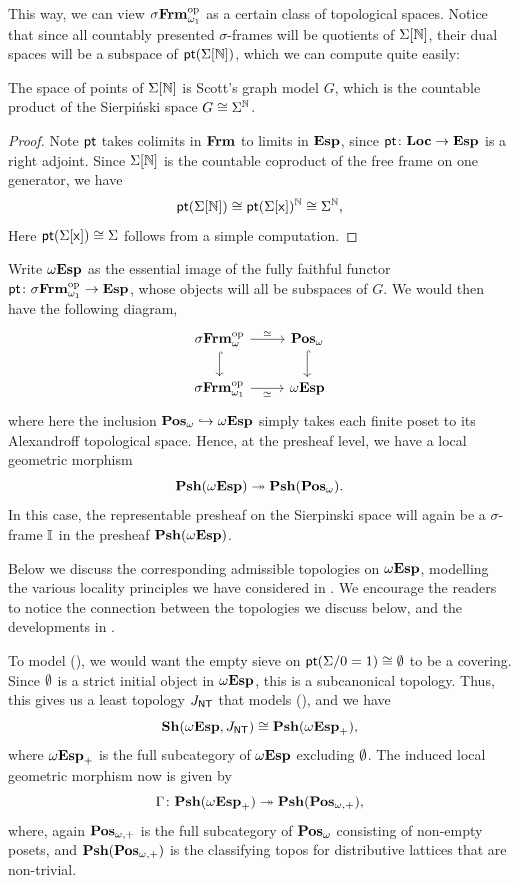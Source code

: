 This way, we can view $\sigma\mathbf{Frm}_{\omega_1}^{\mathrm{op}}$ as a certain class of topological spaces. Notice that since all countably presented $\sigma$-frames will be quotients of $\Sigma[\mathbb{N}]$, their dual spaces will be a subspace of $\mathsf{pt}(\Sigma[\mathbb{N}])$, which we can compute quite easily:

\begin{lemma}
  The space of points of $\Sigma[\mathbb{N}]$ is Scott's graph model $G$, which is the countable product of the Sierpi\'nski space $G \cong \Sigma^{\mathbb{N}}$.
\end{lemma}
\begin{proof}
  Note $\mathsf{pt}$ takes colimits in $\mathbf{Frm}$ to limits in $\mathbf{Esp}$, since $\mathsf{pt} \colon \mathbf{Loc} \to \mathbf{Esp}$ is a right adjoint. Since $\Sigma[\mathbb{N}]$ is the countable coproduct of the free frame on one generator, we have
  \[ \mathsf{pt}(\Sigma[\mathbb{N}]) \cong \mathsf{pt}(\Sigma[\mathsf{x}])^{\mathbb{N}} \cong \Sigma^{\mathbb{N}}\text{,} \]
  Here $\mathsf{pt}(\Sigma[\mathsf{x}]) \cong \Sigma$ follows from a simple computation.
\end{proof}

Write $\omega\mathbf{Esp}$ as the essential image of the fully faithful functor $\mathsf{pt} \colon \sigma\mathbf{Frm}_{\omega_1}^{\mathrm{op}} \to \mathbf{Esp}$, whose objects will all be subspaces of $G$. We would then have the following diagram,
\[
\begin{tikzcd}
  \sFrm\fp\op \ar[d, hook] \ar[r, "\simeq"] & \Pos\fp \ar[d, hook] \\
  \sFrm\cp\op \ar[r, "\simeq"'] & \wTop
\end{tikzcd}
\]
where here the inclusion $\mathbf{Pos}_\omega \hookrightarrow \omega\mathbf{Esp}$ simply takes each finite poset to its Alexandroff topological space. Hence, at the presheaf level, we have a local geometric morphism
\[ \mathbf{Psh}(\omega\mathbf{Esp}) \twoheadrightarrow \mathbf{Psh}(\mathbf{Pos}_\omega)\text{.} \]
In this case, the representable presheaf on the Sierpinski space will again be a $\sigma$-frame $\mathbb{I}$ in the presheaf $\mathbf{Psh}(\omega\mathbf{Esp})$.

Below we discuss the corresponding admissible topologies on $\omega\mathbf{Esp}$, modelling the various locality principles we have considered in . We encourage the readers to notice the connection between the topologies we discuss below, and the developments in .

\begin{example}[\AxiomNT]
  To model (\AxiomNT), we would want the empty sieve on $\mathsf{pt}(\Sigma/0=1) \cong \emptyset$ to be a covering. Since $\emptyset$ is a strict initial object in $\omega\mathbf{Esp}$, this is a subcanonical topology. Thus, this gives us a least topology $J_{\mathsf{NT}}$ that models (\AxiomNT), and we have
  \[ \mathbf{Sh}(\omega\mathbf{Esp},J_{\mathsf{NT}}) \cong \mathbf{Psh}(\omega\mathbf{Esp}_+)\text{,} \]
  where $\omega\mathbf{Esp}_+$ is the full subcategory of $\omega\mathbf{Esp}$ excluding $\emptyset$. The induced local geometric morphism now is given by 
  \[ \Gamma \colon \mathbf{Psh}(\omega\mathbf{Esp}_+) \twoheadrightarrow \mathbf{Psh}(\mathbf{Pos}_{\mathrm{\omega,+}})\text{,} \]
  where, again $\mathbf{Pos}_{\mathrm{\omega,+}}$ is the full subcategory of $\mathbf{Pos}_{\mathrm{\omega}}$ consisting of non-empty posets, and $\mathbf{Psh}(\mathbf{Pos}_{\mathrm{\omega,+}})$ is the classifying topos for distributive lattices that are non-trivial.
\end{example}

